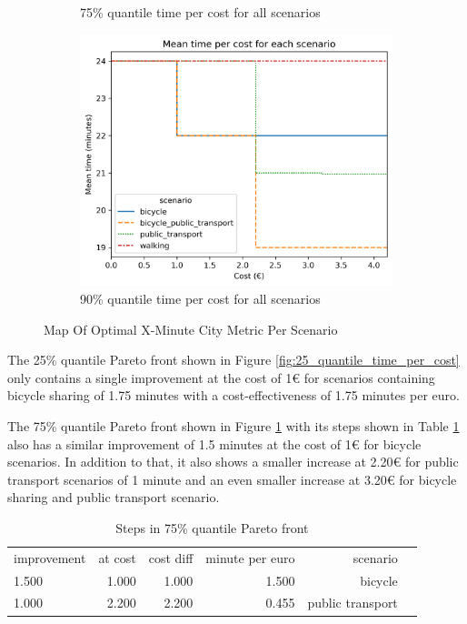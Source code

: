 \begin{figure}
\begin{subfigure}[b]{0.48\textwidth}
         \caption{75\% quantile time per cost for all scenarios}
         \label{fig:75_quantile_time_per_cost}
     \end{subfigure}
     \hfill
     \begin{subfigure}[b]{0.48\textwidth}
         \centering
         \includegraphics[width=\textwidth]{Figures/results/metric_cost/quantile_90_time_per_cost_for_each_scenario_without_car.png}
         \caption{90\% quantile time per cost for all scenarios}
         \label{fig:90_quantile_time_per_cost}
     \end{subfigure}
        \caption{Map Of Optimal X-Minute City Metric Per Scenario}
        \label{fig:quantile_time_per_cost}
\end{figure}

The 25\% quantile Pareto front shown in Figure \ref{fig:25_quantile_time_per_cost} only contains a single improvement at the cost of 1€ for scenarios containing bicycle sharing of 1.75 minutes with a cost-effectiveness of 1.75 minutes per euro.


The 75\% quantile Pareto front shown in Figure \ref{fig:75_quantile_time_per_cost} with its steps shown in Table \ref{tab:differences_in_75_quantile_pareto_front} also has a similar improvement of 1.5 minutes at the cost of 1€ for bicycle scenarios.
In addition to that, it also shows a smaller increase at 2.20€ for public transport scenarios of 1 minute and an even smaller increase at 3.20€ for bicycle sharing and public transport scenario.

\begin{table}
  \caption{Steps in 75\% quantile Pareto front}
  \label{tab:differences_in_75_quantile_pareto_front}
  \begin{center}
    \begin{tabular}{lrrrrl}
     improvement & at cost & cost diff & minute per euro & scenario \\
     1.500 & 1.000 & 1.000 & 1.500 & bicycle \\
     1.000 & 2.200 & 2.200 & 0.455 & public transport \\
    \end{tabular}
  \end{center}
\end{table}


